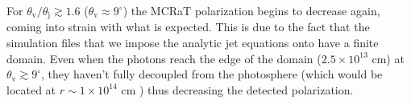 \documentclass[12pt,a4paper]{article}
\begin{document}
For $\theta_{\mathrm{v}}/\theta_{\mathrm{j}} \gtrsim 1.6$ ($\theta_{\mathrm{v}} \approx 9^\circ$) the MCRaT polarization begins to decrease again, coming into strain with what is expected. This is due to the fact that the simulation files that we impose the analytic jet equations onto have a finite domain. Even when the photons reach the edge of the domain ($2.5 \times 10^{13}$ cm) at $\theta_{\mathrm{v}} \gtrsim 9^\circ$, they haven't fully decoupled from the photosphere (which would be located at $r\sim 1\times 10^{14}$ cm \citep{lundman2014polarization}) thus decreasing the detected polarization. 


\end{document}

